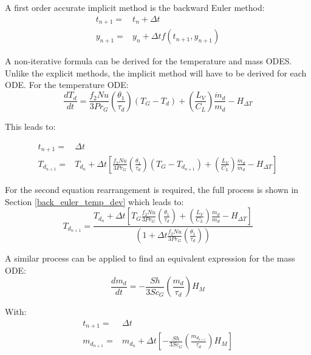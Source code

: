 \documentclass[../Interim_Report_Master]{subfiles}
\begin{document}
A first order accurate implicit method is the backward Euler method:
\begin{subequations}
\begin{eqnarray}
t_{n+1} =& t_n + \Delta t \\
y_{n+1} =& y_n + \Delta t f(t_{n+1},y_{n+1})
\end{eqnarray}
\end{subequations} 

A non-iterative formula can be derived for the temperature and mass ODES. Unlike the explicit methods, the implicit method will have to be derived for each ODE. For the temperature ODE:
\begin{equation}
\frac{dT_{d}}{dt} = \frac{f_{2}Nu}{3Pr_{G}}\left(\frac{\theta_1}{\tau_d}\right)(T_{G}-T_{d}) + \left(\frac{L_{V}}{C_{L}}\right)\frac{\dot{m}_{d}}{m_{d}} - H_{\Delta T}
\end{equation}

This leads to:

\begin{subequations}
\begin{align}
t_{n+1} =& \Delta t \\
T_{d_{n+1}} =& T_{d_{n}} + \Delta t \left[\frac{f_{2}Nu}{3Pr_{G}}\left(\frac{\theta_1}{\tau_d}\right)(T_{G}-T_{d_{n+1}}) + \left(\frac{L_{V}}{C_{L}}\right)\frac{\dot{m}_{d}}{m_{d}} - H_{\Delta T}\right]
\end{align}
\end{subequations} 

For the second equation rearrangement is required, the full process is shown in Section \ref{back_euler_temp_dev} which leads to:
\begin{equation}
T_{d_{n+1}} = \frac{T_{d_{n}} + \Delta t \left[T_{G}\frac{f_{2}Nu}{3Pr_{G}}\left(\frac{\theta_1}{\tau_d}\right) + \left(\frac{L_{V}}{C_{L}}\right)\frac{\dot{m}_{d}}{m_{d}} - H_{\Delta T}\right]}{\left(1+\Delta t\frac{f_{2}Nu}{3Pr_{G}}\left(\frac{\theta_1}{\tau_d}\right)\right)} 
\end{equation} 

A similar process can be applied to find an equivalent expression for the mass ODE:
\begin{equation}
\frac{dm_{d}}{dt} = -\frac{Sh}{3Sc_{G}}\left(\frac{m_{d}}{\tau_{d}}\right)H_M
\end{equation}

With:
\begin{subequations}
\begin{align}
t_{n+1} =& \Delta t \\
m_{d_{n+1}} =& m_{d_{n}} + \Delta t \left[-\frac{Sh}{3Sc_{G}}\left(\frac{m_{d_{n+1}}}{\tau_{d}}\right)H_M\right]
\end{align}
\end{subequations} 
\end{document}
